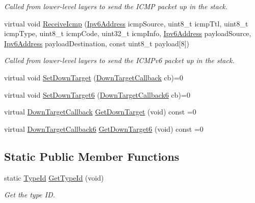 \begin{DoxyCompactItemize}
\begin{DoxyCompactList}\small\item\em Called from lower-\/level layers to send the I\+C\+MP packet up in the stack. \end{DoxyCompactList}\item 
virtual void \hyperlink{classns3_1_1IpL4Protocol_a8f5ccf55cde8c20f9b73f9181eae6f80}{Receive\+Icmp} (\hyperlink{classns3_1_1Ipv6Address}{Ipv6\+Address} icmp\+Source, uint8\+\_\+t icmp\+Ttl, uint8\+\_\+t icmp\+Type, uint8\+\_\+t icmp\+Code, uint32\+\_\+t icmp\+Info, \hyperlink{classns3_1_1Ipv6Address}{Ipv6\+Address} payload\+Source, \hyperlink{classns3_1_1Ipv6Address}{Ipv6\+Address} payload\+Destination, const uint8\+\_\+t payload\mbox{[}8\mbox{]})
\begin{DoxyCompactList}\small\item\em Called from lower-\/level layers to send the I\+C\+M\+Pv6 packet up in the stack. \end{DoxyCompactList}\item 
virtual void \hyperlink{classns3_1_1IpL4Protocol_a9fc5e8e30a16bdc87623fa2ebc981af3}{Set\+Down\+Target} (\hyperlink{classns3_1_1IpL4Protocol_ae3ba76c0a48fbaa90529c528a15f12b6}{Down\+Target\+Callback} cb)=0
\item 
virtual void \hyperlink{classns3_1_1IpL4Protocol_a2c3427eada095f3ae9a5e78fe6523e1e}{Set\+Down\+Target6} (\hyperlink{classns3_1_1IpL4Protocol_a039f3d1883632ab922fa958fc9ecd97f}{Down\+Target\+Callback6} cb)=0
\item 
virtual \hyperlink{classns3_1_1IpL4Protocol_ae3ba76c0a48fbaa90529c528a15f12b6}{Down\+Target\+Callback} \hyperlink{classns3_1_1IpL4Protocol_ac0689deffbf226af223668bca54870d0}{Get\+Down\+Target} (void) const =0
\item 
virtual \hyperlink{classns3_1_1IpL4Protocol_a039f3d1883632ab922fa958fc9ecd97f}{Down\+Target\+Callback6} \hyperlink{classns3_1_1IpL4Protocol_a208389e5d6362765a58c50264b13b18d}{Get\+Down\+Target6} (void) const =0
\end{DoxyCompactItemize}
\subsection*{Static Public Member Functions}
\begin{DoxyCompactItemize}
\item 
static \hyperlink{classns3_1_1TypeId}{Type\+Id} \hyperlink{classns3_1_1IpL4Protocol_a759b2296875c238bfaf4a75b34ff11ca}{Get\+Type\+Id} (void)
\begin{DoxyCompactList}\small\item\em Get the type ID. \end{DoxyCompactList}\end{DoxyCompactItemize}
